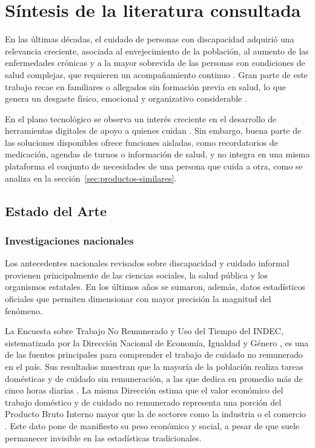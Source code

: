 
\chapter{Síntesis de la literatura consultada}\label{cap:marco-teorico}

En las últimas décadas, el cuidado de personas con discapacidad adquirió una relevancia creciente, asociada al envejecimiento de la población, al aumento de las enfermedades crónicas y a la mayor sobrevida de las personas con condiciones de salud complejas, que requieren un acompañamiento continuo \citep{who2022}. Gran parte de este trabajo recae en familiares o allegados sin formación previa en salud, lo que genera un desgaste físico, emocional y organizativo considerable \citep{mesacuidados2020}.

En el plano tecnológico se observa un interés creciente en el desarrollo de herramientas digitales de apoyo a quienes cuidan \citep{schwedler2025,gallagher2026}. Sin embargo, buena parte de las soluciones disponibles ofrece funciones aisladas, como recordatorios de medicación, agendas de turnos o información de salud, y no integra en una misma plataforma el conjunto de necesidades de una persona que cuida a otra, como se analiza en la sección~\ref{sec:productos-similares}.

\section{Estado del Arte}

\subsection{Investigaciones nacionales}

Los antecedentes nacionales revisados sobre discapacidad y cuidado informal provienen principalmente de las ciencias sociales, la salud pública y los organismos estatales. En los últimos años se sumaron, además, datos estadísticos oficiales que permiten dimensionar con mayor precisión la magnitud del fenómeno.

La Encuesta sobre Trabajo No Remunerado y Uso del Tiempo del INDEC, sistematizada por la Dirección Nacional de Economía, Igualdad y Género \citep{dneyg2020}, es una de las fuentes principales para comprender el trabajo de cuidado no remunerado en el país. Sus resultados muestran que la mayoría de la población realiza tareas domésticas y de cuidado sin remuneración, a las que dedica en promedio más de cinco horas diarias \citep{dneyg2020}. La misma Dirección estima que el valor económico del trabajo doméstico y de cuidado no remunerado representa una porción del Producto Bruto Interno mayor que la de sectores como la industria o el comercio \citep{dneyg2020}. Este dato pone de manifiesto su peso económico y social, a pesar de que suele permanecer invisible en las estadísticas tradicionales.

